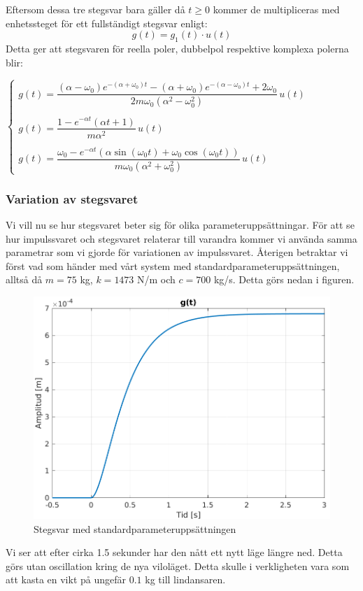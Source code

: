 Eftersom dessa tre stegsvar bara gäller då $t\ge 0$ kommer de multipliceras med enhetssteget för ett fullständigt stegsvar enligt:
$$g(t)=g_1(t)\cdot u(t)$$
Detta ger att stegsvaren för reella poler, dubbelpol respektive komplexa polerna blir:

$\begin{cases}
g(t)=\dfrac{(\alpha-\omega_0)e^{-(\alpha+\omega_0)t}-(\alpha+\omega_0)e^{-(\alpha-\omega_0)t}+2\omega_0}{2m\omega_0(\alpha^2-\omega_0^2)}\,u(t) \\\\
g(t)=\dfrac{1-e^{-\alpha t}(\alpha t+1)}{m\alpha^2}\,u(t) \\\\
g(t)=\dfrac{\omega_0-e^{-\alpha t}(\alpha\sin(\omega_0 t)+\omega_0\cos(\omega_0 t))}{m\omega_0(\alpha^2+\omega_0^2)}\,u(t)
\end{cases}$


\newpage
\subsubsection{Variation av stegsvaret}
Vi vill nu se hur stegsvaret beter sig för olika parameteruppsättningar. För att se hur impulssvaret och stegsvaret relaterar till varandra kommer vi använda samma parametrar som vi gjorde för variationen av impulssvaret. Återigen betraktar vi först vad som händer med vårt system med standardparameteruppsättningen, alltså då $m = 75$ kg, $k=1473$ N/m och $c=700$ kg/s. Detta görs nedan i figuren.
\begin{figure}[H]
    \centering
    \includegraphics[scale=0.9]{bilder/stegsvar}
    \caption{Stegsvar med standardparameteruppsättningen}
    \label{fig:stegsvar}
\end{figure}
Vi ser att efter cirka 1.5 sekunder har den nått ett nytt läge längre ned. Detta görs utan oscillation kring de nya viloläget. Detta skulle i verkligheten vara som  att kasta en vikt på ungefär $0.1$ kg till lindansaren.

